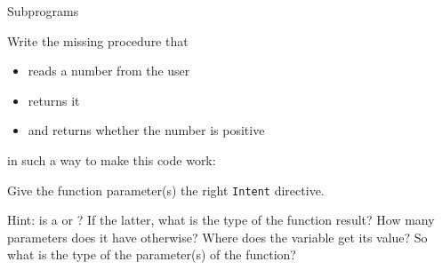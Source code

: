  {Subprograms}

\begin{exercise}
  \label{ex:flooppos}
  Write the missing procedure  that
  \begin{itemize}
  \item reads a number from the user
  \item returns it
  \item and returns whether the number is positive
  \end{itemize}
  in such a way to make this code work:
  

  Give the function parameter(s) the right \lstinline{Intent} directive.

  Hint: is  a  or ? If the
  latter, what is the type of the function result? How many parameters
  does it have otherwise? Where does the variable  get
  its value? So what is the type of the parameter(s) of the function?
\end{exercise}

